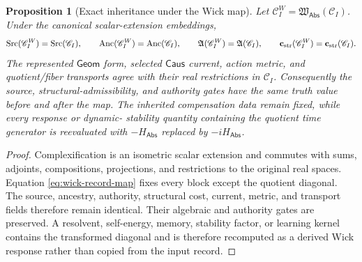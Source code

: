 \documentclass[11pt]{article}
\numberwithin{section}{part}
\theoremstyle{plain}
\newtheorem{proposition}[proposition]{Proposition}
\theoremstyle{definition}
\theoremstyle{remark}
\newcommand{\Geom}{\mathsf{Geom}}
\newcommand{\Caus}{\mathsf{Caus}}
\newcommand{\Abs}{\mathsf{Abs}}
\newcommand{\Anc}{\operatorname{Anc}}
\newcommand{\Src}{\operatorname{Src}}
\begin{document}
\begin{proposition}[Exact inheritance under the Wick map]
\label{prop:wick-exact-inheritance}
Let \(\mathscr C_I^W=\mathfrak W_{\Abs}(\mathscr C_I)\).  Under the canonical
scalar-extension embeddings,
\begin{equation}
 \label{eq:wick-inherited-record-identities}
 \Src(\mathscr C_I^W)=\Src(\mathscr C_I),\qquad
 \Anc(\mathscr C_I^W)=\Anc(\mathscr C_I),\qquad
 \mathfrak A(\mathscr C_I^W)=\mathfrak A(\mathscr C_I),\qquad
 \mathbf c_{\rm str}(\mathscr C_I^W)=\mathbf c_{\rm str}(\mathscr C_I).
\end{equation}
The represented \(\Geom\) form, selected \(\Caus\) current, action metric,
and quotient/fiber transports agree with their real restrictions in
\(\mathscr C_I\).  Consequently the source, structural-admissibility, and
authority gates have the same truth value before and after the map.  The
inherited compensation data remain fixed, while every response or dynamic-
stability quantity containing the quotient time generator is reevaluated
with \(-H_{\Abs}\) replaced by \(-iH_{\Abs}\).
\end{proposition}

\begin{proof}
Complexification is an isometric scalar extension and commutes with sums,
adjoints, compositions, projections, and restrictions to the original real
spaces.  Equation \eqref{eq:wick-record-map} fixes every block except the
quotient diagonal.  The source, ancestry, authority, structural cost,
current, metric, and transport fields therefore remain identical.  Their
algebraic and authority gates are preserved.  A resolvent, self-energy,
memory, stability factor, or learning kernel contains the transformed
diagonal and is therefore recomputed as a derived Wick response rather than
copied from the input record.
\end{proof}
\end{document}
